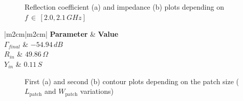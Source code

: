 \documentclass[10 pt,a4paper,twocolumn]{article}
\begin{document}
{\begin{figure}[t!]
	\centering
	\begin{subfigure}[b]{0.44\linewidth}
		\def\svgwidth{\linewidth}
		\tiny{}
		\caption{}
	\end{subfigure}
\hspace{0.05\linewidth}
	\begin{subfigure}[b]{0.46\linewidth}
		\def\svgwidth{\linewidth}
		\tiny{}
		\caption{}
	\end{subfigure}
	\caption{Reflection coefficient (a) and impedance (b) plots depending on $f\,\in\,[2.0,2.1\,GHz]$}
	\label{fig:Gamma and Z previa wfeed}
\end{figure}


\begin{table}
	\begin{center}
		{\selectfont	\begin{tabular}{|m{2cm}|m{2cm}|}
				\hline
				\textbf{Parameter} & \textbf{Value}\\
				\hline
				$\Gamma_{final}$ & $-54.94\,dB$\\
				\hline
				$R_{in}$ & $49.86\,\Omega$ \\
				\hline
				$Y_{in}$ & $ 0.11\,S$ \\
				\hline
		\end{tabular}}
		\caption{Final $\Gamma$ and impedance matching values after last optimization choice: the $w_{\operatorname{feed}}$ change}
		\label{table:Gamma and Z}
	\end{center}
\end{table}
\begin{figure}[bt!]
	\begin{subfigure}{0.48\linewidth}
		\def\svgwidth{\linewidth}
		\tiny{}
		\caption{}
		\label{fig:first contour}
	\end{subfigure}
	\hfill
	\begin{subfigure}{0.48\linewidth}
		\def\svgwidth{\linewidth}
		\tiny{}
		\caption{}
		\label{fig:second contour}
	\end{subfigure}
	\caption{First (a) and second (b) contour plots depending on the patch size ($L_{\operatorname{patch}}$ and $W_{\operatorname{patch}}$ variations)}
\end{figure}


}
\end{document}
